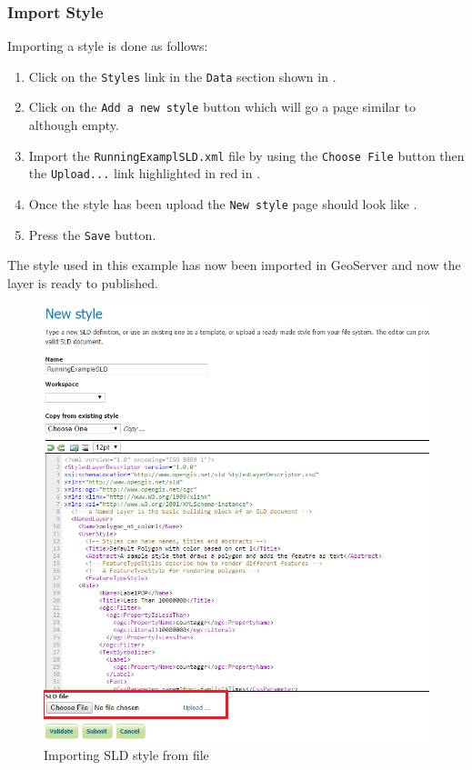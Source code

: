 \clearpage
\subsubsection{Import Style}
Importing a style is done as follows:
\begin{enumerate}[resume]
	\item Click on the \lstinline|Styles| link in the \lstinline|Data| section shown in .
	\item Click on the \lstinline|Add a new style| button which will go a page similar to  although empty.
	\item Import the \lstinline|RunningExamplSLD.xml| file by using the \lstinline|Choose File| button then the \lstinline|Upload...| link highlighted in red in .
	\item Once the style has been upload the \lstinline|New style| page should look like .
	\item Press the \lstinline|Save| button.
\end{enumerate}
The style used in this example has now been imported in GeoServer and now the layer is ready to published.
\begin{figure}[h!]
	\centering
	\includegraphics[scale=0.5]{Figures/NewStyleImport.png}
	\caption{\label{fig:styleimport}Importing SLD style from file}
\end{figure}

